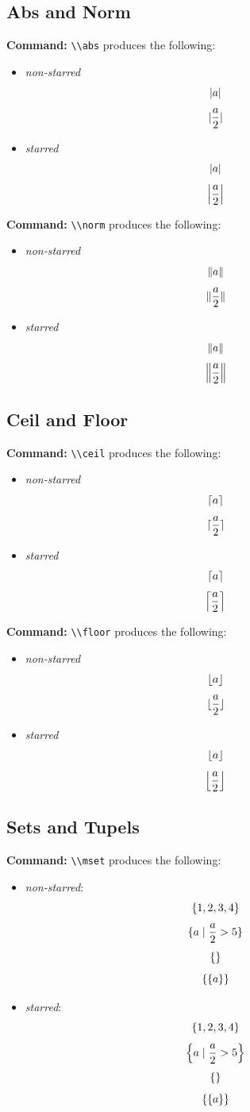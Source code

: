 \documentclass[a4paper,10pt,oneside]{scrartcl}
\newcommand{\commandcmd}[1]{\par\noindent\textbf{Command:} \lstinline^\\#1^}
\begin{document}
\subsection{Abs and Norm}
\commandcmd{abs} produces the following:
\begin{itemize}
  \item \emph{non-starred}
        \[\abs{a}\]
        \[\abs{\frac{a}{2}}\]
  \item \emph{starred}
        \[\abs*{a}\]
        \[\abs*{\frac{a}{2}}\]
\end{itemize}

\commandcmd{norm} produces the following:
\begin{itemize}
  \item \emph{non-starred}
        \[\norm{a}\]
        \[\norm{\frac{a}{2}}\]
  \item \emph{starred}
        \[\norm*{a}\]
        \[\norm*{\frac{a}{2}}\]
\end{itemize}

\subsection{Ceil and Floor}
\commandcmd{ceil} produces the following:
\begin{itemize}
  \item \emph{non-starred}
        \[\ceil{a}\]
        \[\ceil{\frac{a}{2}}\]
  \item \emph{starred}
        \[\ceil*{a}\]
        \[\ceil*{\frac{a}{2}}\]
\end{itemize}

\commandcmd{floor} produces the following:
\begin{itemize}
  \item \emph{non-starred}
        \[\floor{a}\]
        \[\floor{\frac{a}{2}}\]
  \item \emph{starred}
        \[\floor*{a}\]
        \[\floor*{\frac{a}{2}}\]
\end{itemize}

\subsection{Sets and Tupels}
\commandcmd{mset} produces the following:
\begin{itemize}
  \item \emph{non-starred}:
        \[\mset{1, 2, 3, 4}\]
        \[\mset{a \mid \frac{a}{2} > 5}\]
        \[\mset{}\]
        \[\mset{\mset{a}}\]
  \item \emph{starred}:
        \[\mset*{1, 2, 3, 4}\]
        \[\mset*{a \mid \frac{a}{2} > 5}\]
        \[\mset*{}\]
        \[\mset*{\mset*{a}}\]
\end{itemize}
\end{document}
